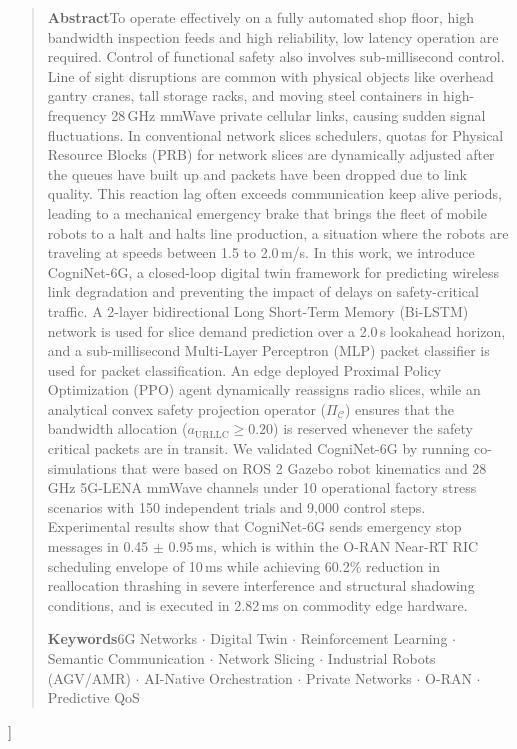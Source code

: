 \documentclass[twocolumn,10pt,twoside]{article}
\begin{document}
{  \begin{quote}
  \small
  \textbf{\sffamily Abstract}\quad To operate effectively on a fully automated shop floor, high bandwidth inspection feeds and high reliability, low latency operation are required. Control of functional safety also involves sub-millisecond control. Line of sight disruptions are common with physical objects like overhead gantry cranes, tall storage racks, and moving steel containers in high-frequency 28\,GHz mmWave private cellular links, causing sudden signal fluctuations. In conventional network slices schedulers, quotas for Physical Resource Blocks (PRB) for network slices are dynamically adjusted after the queues have built up and packets have been dropped due to link quality. This reaction lag often exceeds communication keep alive periods, leading to a mechanical emergency brake that brings the fleet of mobile robots to a halt and halts line production, a situation where the robots are traveling at speeds between 1.5 to 2.0\,m/s. In this work, we introduce CogniNet-6G, a closed-loop digital twin framework for predicting wireless link degradation and preventing the impact of delays on safety-critical traffic. A 2-layer bidirectional Long Short-Term Memory (Bi-LSTM) network is used for slice demand prediction over a 2.0\,s lookahead horizon, and a sub-millisecond Multi-Layer Perceptron (MLP) packet classifier is used for packet classification. An edge deployed Proximal Policy Optimization (PPO) agent dynamically reassigns radio slices, while an analytical convex safety projection operator ($\Pi_{\mathcal{C}}$) ensures that the bandwidth allocation ($a_{\text{URLLC}} \ge 0.20$) is reserved whenever the safety critical packets are in transit. We validated CogniNet-6G by running co-simulations that were based on ROS 2 Gazebo robot kinematics and 28\,GHz 5G-LENA mmWave channels under 10 operational factory stress scenarios with 150 independent trials and 9,000 control steps. Experimental results show that CogniNet-6G sends emergency stop messages in 0.45 $\pm$ 0.95\,ms, which is within the O-RAN Near-RT RIC scheduling envelope of 10\,ms while achieving 60.2\% reduction in reallocation thrashing in severe interference and structural shadowing conditions, and is executed in 2.82\,ms on commodity edge hardware.\par
  \vspace{0.6em}
  \noindent\textbf{\sffamily Keywords}\quad 6G Networks $\cdot$ Digital Twin $\cdot$ Reinforcement Learning $\cdot$ Semantic Communication $\cdot$ Network Slicing $\cdot$ Industrial Robots (AGV/AMR) $\cdot$ AI-Native Orchestration $\cdot$ Private Networks $\cdot$ O-RAN $\cdot$ Predictive QoS
  \end{quote}
  \vspace{1.0em}
}]
\end{document}
